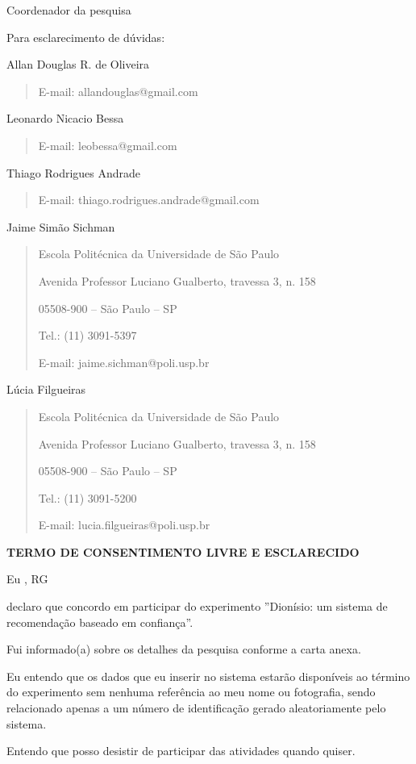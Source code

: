 Coordenador da pesquisa

\vspace{0.2in}

Para esclarecimento de dúvidas:

Allan Douglas R. de Oliveira
\begin{quote}
	E-mail: allandouglas@gmail.com
\end{quote}
Leonardo Nicacio Bessa
\begin{quote}
	E-mail: leobessa@gmail.com
\end{quote}	
Thiago Rodrigues Andrade
\begin{quote}
	E-mail: thiago.rodrigues.andrade@gmail.com
\end{quote}
Jaime Simão Sichman
\begin{quote}
Escola Politécnica da Universidade de São Paulo

Avenida Professor Luciano Gualberto, travessa 3, n. 158

05508-900 – São Paulo – SP

Tel.: (11) 3091-5397

E-mail: jaime.sichman@poli.usp.br
\end{quote}
Lúcia Filgueiras
\begin{quote}
Escola Politécnica da Universidade de São Paulo

Avenida Professor Luciano Gualberto, travessa 3, n. 158

05508-900 – São Paulo – SP

Tel.: (11) 3091-5200

E-mail: lucia.filgueiras@poli.usp.br
\end{quote}
\vspace{3.5in}
\centerline{\textbf{TERMO DE CONSENTIMENTO LIVRE E ESCLARECIDO}}

Eu \hspace{9.5cm}, RG \hspace{4.5cm} 

declaro que concordo em participar do experimento ''Dionísio: um sistema de recomendação baseado em confiança''.

Fui informado(a) sobre os detalhes da pesquisa conforme a carta anexa.

Eu entendo que os dados que eu inserir no sistema estarão disponíveis ao término do experimento sem nenhuma referência ao meu nome ou fotografia, sendo relacionado  apenas a um número de identificação gerado aleatoriamente pelo sistema.

Entendo que posso desistir de participar das atividades quando quiser. 

